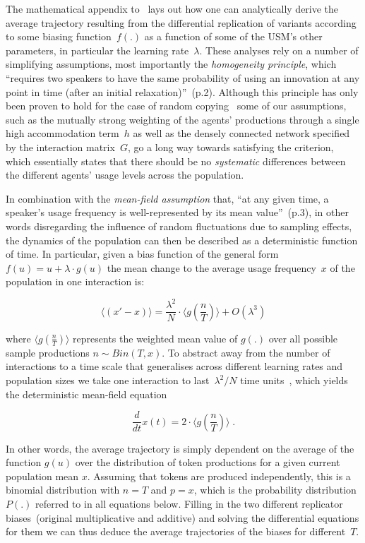 The mathematical appendix to~\citet{Blythe2012} lays out how one can analytically derive the average trajectory resulting from the differential replication of variants according to some biasing function~$f(.)$ as a function of some of the USM's other parameters, in particular the learning rate~$\lambda$. These analyses rely on a number of simplifying assumptions, most importantly the \emph{homogeneity principle}, which ``requires two speakers to have the same probability of using an innovation at any point in time (after an initial relaxation)''~(p.2).
Although this principle has only been proven to hold for the case of random copying~\citep{Blythe2010} some of our assumptions, such as the mutually strong weighting of the agents' productions through a single high accommodation term~$h$ as well as the densely connected network specified by the interaction matrix~$G$, go a long way towards satisfying the criterion, which essentially states that there should be no \emph{systematic} differences between the different agents' usage levels across the population.

In combination with the \emph{mean-field assumption} that, ``at any given time, a speaker’s usage frequency is well-represented by its mean value''~(p.3), in other words disregarding the influence of random fluctuations due to sampling effects, the dynamics of the population can then be described as a deterministic function of time. In particular, given a bias function of the general form $f(u)=u+\lambda\cdot g(u)$ the mean change to the average usage frequency~$x$ of the population in one interaction is:

$$\langle(x'-x)\rangle=\frac{\lambda^2}{N}\cdot\langle g(\frac{n}{T})\rangle + O(\lambda^3)$$

where $\langle g(\frac{n}{T})\rangle$ represents the weighted mean value of $g(.)$ over all possible sample productions $n\sim Bin(T,x)$.
To abstract away from the number of interactions to a time scale that generalises across different learning rates and population sizes we take one interaction to last~$\lambda^2/N$ time units~\citep[see][]{Baxter2006,Baxter2009}, which yields the deterministic mean-field equation

$$\frac{d}{dt}x(t)=2\cdot\langle g(\frac{n}{T})\rangle\;.$$

In other words, the average trajectory is simply dependent on the average of the function $g(u)$ over the distribution of token productions for a given current population mean $x$. Assuming that tokens are produced independently, this is a binomial distribution with $n=T$ and $p=x$, which is the probability distribution~$P(.)$ referred to in all equations below. Filling in the two different replicator biases~(original multiplicative and additive) and solving the differential equations for them we can thus deduce the average trajectories of the biases for different~$T$.

